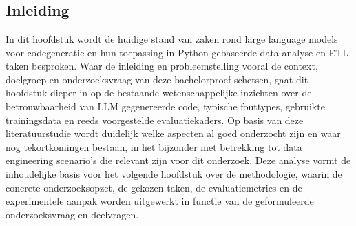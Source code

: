 \chapter{}%
\label{ch:stand-van-zaken}


%
%
%
%


\section{Inleiding}

In dit hoofdstuk wordt de huidige stand van zaken rond large language models voor codegeneratie en hun toepassing in Python gebaseerde data analyse en ETL taken besproken. Waar de inleiding en probleemstelling vooral de context, doelgroep en onderzoeksvraag van deze bachelorproef schetsen, gaat dit hoofdstuk dieper in op de bestaande wetenschappelijke inzichten over de betrouwbaarheid van LLM gegenereerde code, typische fouttypes, gebruikte trainingsdata en reeds voorgestelde evaluatiekaders. Op basis van deze literatuurstudie wordt duidelijk welke aspecten al goed onderzocht zijn en waar nog tekortkomingen bestaan, in het bijzonder met betrekking tot data engineering scenario's die relevant zijn voor dit onderzoek. Deze analyse vormt de inhoudelijke basis voor het volgende hoofdstuk over de methodologie, waarin de concrete onderzoeksopzet, de gekozen taken, de evaluatiemetrics en de experimentele aanpak worden uitgewerkt in functie van de geformuleerde onderzoeksvraag en deelvragen.


